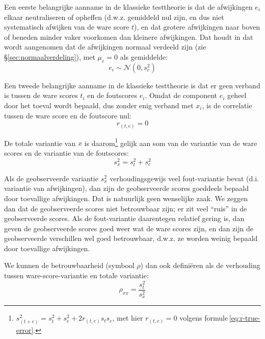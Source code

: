 \documentclass[
]{book}
\begin{document}
Een eerste belangrijke aanname in de klassieke testtheorie is dat de
afwijkingen \(e_i\) elkaar neutraliseren of opheffen (d.w.z. gemiddeld nul
zijn, en dus niet systematisch afwijken van de ware score \(t\)), en dat
grotere afwijkingen naar boven of beneden minder vaker voorkomen dan
kleinere afwijkingen. Dat houdt in dat wordt aangenomen dat de
afwijkingen normaal verdeeld zijn (zie
§\ref{sec:normaalverdeling}), met \(\mu_e=0\) als gemiddelde:
\begin{equation}
  \label{eq:normal-error}
  e_i \sim \mathcal{N}(0,s^2_e)
\end{equation}

Een tweede belangrijke aanname in de klassieke testtheorie is dat er
geen verband is tussen de ware scores \(t_i\) en de foutscores \(e_i\).
Omdat de component \(e_i\) geheel door het toeval wordt bepaald, dus
zonder enig verband met \(x_i\), is de correlatie tussen de ware score en
de foutscore nul:
\begin{equation}
  \label{eq:r-true-error}
  r_{(t,e)} = 0
\end{equation}

De totale variantie van \(x\) is daarom\footnote{\(s^2_{(t+e)} = s^2_t + s^2_e + 2 r_{(t,e)} s_t s_e\), met hier \(r_{(t,e)}=0\) volgens formule \eqref{eq:r-true-error}.} gelijk aan som van de
variantie van de ware scores en de variantie van de foutscores:
\begin{equation}
  \label{eq:var-true-error}
  s^2_x = s^2_t + s^2_e
\end{equation}

Als de geobserveerde variantie \(s^2_x\) verhoudingsgewijs veel
fout-variantie bevat (d.i. variantie van afwijkingen), dan zijn de
geobserveerde scores goeddeels bepaald door toevallige afwijkingen. Dat
is natuurlijk geen wenselijke zaak. We zeggen dan dat de geobserveerde
scores niet betrouwbaar zijn; er zit veel ``ruis'' in de geobserveerde
scores. Als de fout-variantie daarentegen relatief gering is, dan geven
de geobserveerde scores goed weer wat de ware scores zijn, en dan zijn
de geobserveerde verschillen wel goed betrouwbaar, d.w.z. ze worden
weinig bepaald door toevallige afwijkingen.

We kunnen de betrouwbaarheid (symbool \(\rho\)) dan ook definiëren als de
verhouding tussen ware-score-variantie en totale variantie:
\begin{equation}
  \label{eq:rho-betrouwbaarheid}
  \rho_{xx} = \frac{s^2_t}{s^2_x}
\end{equation}
\end{document}
